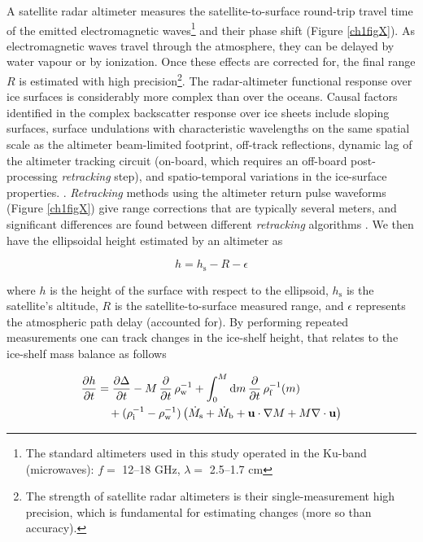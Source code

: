 A satellite radar altimeter measures the satellite-to-surface round-trip travel time of the emitted electromagnetic waves\footnote{The standard altimeters used in this study operated in the Ku-band (microwaves): $f =$ 12--18 GHz, $\lambda =$ 2.5--1.7 cm} and their phase shift (Figure \ref{ch1figX}). As electromagnetic waves travel through the atmosphere, they can be delayed by water vapour or by ionization. Once these effects are corrected for, the final range $R$ is estimated with high precision\footnote{The strength of satellite radar altimeters is their single-measurement high precision, which is fundamental for estimating changes (more so than accuracy).}. The radar-altimeter functional response over ice surfaces is considerably more complex than over the oceans. Causal factors identified in the complex backscatter response over ice sheets include sloping surfaces, surface undulations with characteristic wavelengths on the same spatial scale as the altimeter beam-limited footprint, off-track reflections, dynamic lag of the altimeter tracking circuit (on-board, which requires an off-board post-processing \emph{retracking} step), and spatio-temporal variations in the ice-surface properties. \parencite{Martin1983}. \emph{Retracking} methods using the altimeter return pulse waveforms (Figure \ref{ch1figX}) give range corrections that are typically several meters, and significant differences are found between different \emph{retracking} algorithms \parencite{Davis1996}. We then have the ellipsoidal height estimated by an altimeter as

\begin{equation}
  h = h_\text{s} - R - \epsilon
\end{equation}

where $h$ is the height of the surface with respect to the ellipsoid, $h_\text{s}$ is the satellite's altitude, $R$ is the satellite-to-surface measured range, and $\epsilon$ represents the atmospheric path delay (accounted for). By performing repeated measurements one can track changes in the ice-shelf height, that relates to the ice-shelf mass balance as follows

\begin{equation}
\begin{split}
  \frac{\partial h}{\partial t} &= \frac{\partial \Delta}{\partial t}
    - M \, \frac{\partial}{\partial t} \, \rho^{-1}_\text{w}
    + \int^M_0 \text{d}m \, \frac{\partial}{\partial t} \, \rho^{-1}_\text{f}(m) \\
    &\quad + ( \rho^{-1}_\text{i} - \rho^{-1}_\text{w} ) 
              \left( \dot{M}_\text{s} + \dot{M}_\text{b} + \mathbf{u} \cdot \nabla M
              + M \nabla \cdot \mathbf{u} \right)
\end{split}
\end{equation}

